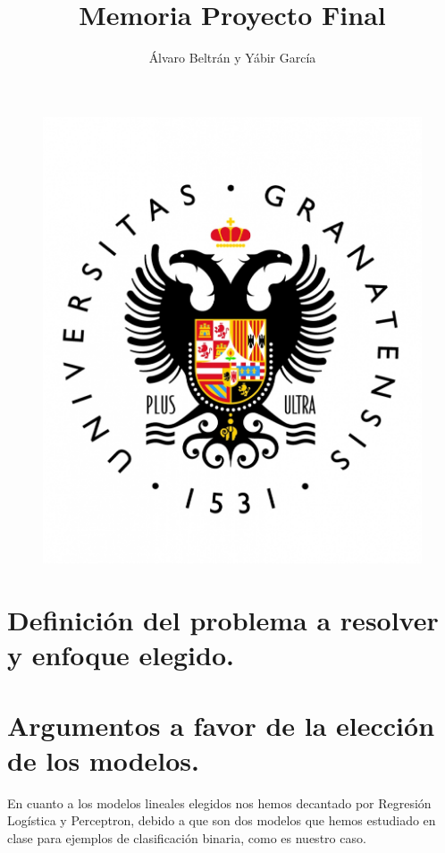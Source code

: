 \documentclass[a4paper,11pt]{article}
\title{Memoria Proyecto Final}
\author{Álvaro Beltrán y Yábir García}
\begin{document}
\maketitle

\begin{figure}[h]
\includegraphics[scale=0.3]{UGR}
\centering
\end{figure}

\newpage

\renewcommand*\contentsname{Índice}
\tableofcontents

\newpage

\section{Definición del problema a resolver y enfoque elegido.}

\section{Argumentos a favor de la elección de los modelos.}

En cuanto a los modelos lineales elegidos nos hemos decantado por Regresión Logística y Perceptron, debido a que son dos modelos que hemos estudiado en clase para ejemplos de clasificación binaria, como es nuestro caso. \\
\end{document}
